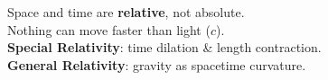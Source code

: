 \documentclass[preview]{standalone}
\begin{document}
Space and time are \textbf{relative}, not absolute.\\Nothing can move faster than light ($c$).\\\textbf{Special Relativity}: \; time dilation & length contraction.\\\textbf{General Relativity}: \; gravity as spacetime curvature.\\
\end{document}
